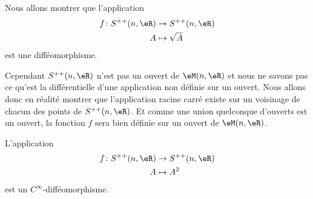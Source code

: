 \begin{normaltext}      \label{NomDJMUooTRUVkS}
    Nous allons montrer que l'application
    \begin{equation}
        \begin{aligned}
            f\colon S^{++}(n,\eR)&\to S^{++}(n,\eR) \\
            A&\mapsto \sqrt{A} 
        \end{aligned}
    \end{equation}
    est une difféomorphisme.

    Cependant \( S^{++}(n,\eR)\) n'est pas un ouvert de \( \eM(n,\eR)\) et nous ne savons pas ce qu'est la différentielle d'une application non définie sur un ouvert. Nous allons donc en réalité montrer que l'application racine carré existe sur un voisinage de chacun des points de \( S^{++}(n,\eR)\). Et comme une union quelconque d'ouverts est un ouvert, la fonction \( f\) sera bien définie sur un ouvert de \( \eM(n,\eR)\).
\end{normaltext}

\begin{lemma}       \label{LemLBFOooDdNcgy}
    L'application 
    \begin{equation}
        \begin{aligned}
            f\colon S^{++}(n,\eR)&\to S^{++}(n,\eR) \\
            A&\mapsto A^2 
        \end{aligned}
    \end{equation}
    est un \(  C^{\infty}\)-difféomorphisme.
\end{lemma}

